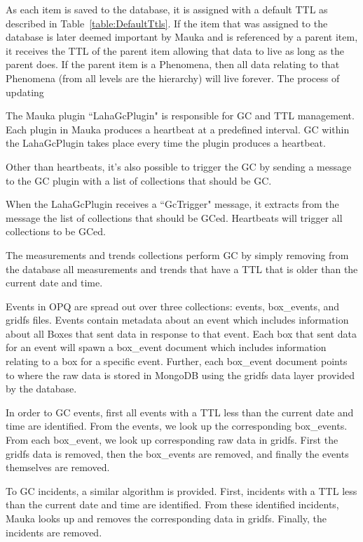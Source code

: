 As each item is saved to the database, it is assigned with a default TTL as described in Table~\ref{table:DefaultTtls}. If the item that was assigned to the database is later deemed important by Mauka and is referenced by a parent item, it receives the TTL of the parent item allowing that data to live as long as the parent does. If the parent item is a Phenomena, then all data relating to that Phenomena (from all levels are the hierarchy) will live forever. The process of updating

The Mauka plugin ``LahaGcPlugin" is responsible for GC and TTL management. Each plugin in Mauka produces a heartbeat at a predefined interval. GC within the LahaGcPlugin takes place every time the plugin produces a heartbeat.

Other than heartbeats, it's also possible to trigger the GC by sending a message to the GC plugin with a list of collections that should be GC\@.

When the LahaGcPlugin receives a ``GcTrigger" message, it extracts from the message the list of collections that should be GCed. Heartbeats will trigger all collections to be GCed.

The measurements and trends collections perform GC by simply removing from the database all measurements and trends that have a TTL that is older than the current date and time.

Events in OPQ are spread out over three collections: events, box\_events, and gridfs files. Events contain metadata about an event which includes information about all Boxes that sent data in response to that event. Each box that sent data for an event will spawn a box\_event document which includes information relating to a box for a specific event. Further, each box\_event document points to where the raw data is stored in MongoDB using the gridfs data layer provided by the database.

In order to GC events, first all events with a TTL less than the current date and time are identified. From the events, we look up the corresponding box\_events. From each box\_event, we look up corresponding raw data in gridfs. First the gridfs data is removed, then the box\_events are removed, and finally the events themselves are removed.

To GC incidents, a similar algorithm is provided. First, incidents with a TTL less than the current date and time are identified. From these identified incidents, Mauka looks up and removes the corresponding data in gridfs. Finally, the incidents are removed.

